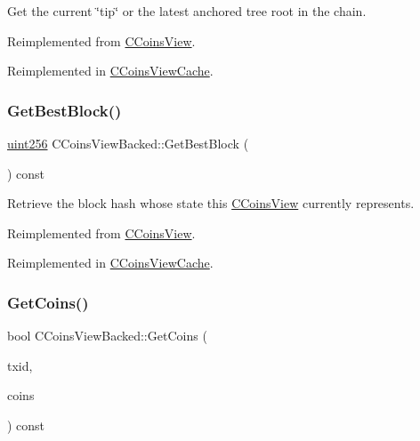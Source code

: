 Get the current \char`\"{}tip\char`\"{} or the latest anchored tree root in the chain. 



Reimplemented from \mbox{\hyperlink{class_c_coins_view_a4d51ab1de57e76a174b5ca874c601b52}{C\+Coins\+View}}.



Reimplemented in \mbox{\hyperlink{class_c_coins_view_cache_a8f1e864bff1617bae243bd0c7b29d2ed}{C\+Coins\+View\+Cache}}.

\mbox{\label{class_c_coins_view_backed_a39bca41ae922d0ce7f40e8aeab289280}} 
\subsubsection{\texorpdfstring{Get\+Best\+Block()}{GetBestBlock()}}
{\footnotesize\ttfamily \mbox{\hyperlink{classuint256}{uint256}} C\+Coins\+View\+Backed\+::\+Get\+Best\+Block (\begin{DoxyParamCaption}{ }\end{DoxyParamCaption}) const\hspace{0.3cm}{\ttfamily [virtual]}}



Retrieve the block hash whose state this \mbox{\hyperlink{class_c_coins_view}{C\+Coins\+View}} currently represents. 



Reimplemented from \mbox{\hyperlink{class_c_coins_view_af81f2907d360a2548d59a61388e5e5cb}{C\+Coins\+View}}.



Reimplemented in \mbox{\hyperlink{class_c_coins_view_cache_a1190c94a943c067d13211179ef06470b}{C\+Coins\+View\+Cache}}.

\mbox{\label{class_c_coins_view_backed_a456f9e85817556329a959c120998df5b}} 
\subsubsection{\texorpdfstring{Get\+Coins()}{GetCoins()}}
{\footnotesize\ttfamily bool C\+Coins\+View\+Backed\+::\+Get\+Coins (\begin{DoxyParamCaption}\item[{const \mbox{\hyperlink{classuint256}{uint256}} \&}]{txid,  }\item[{\mbox{\hyperlink{class_c_coins}{C\+Coins}} \&}]{coins }\end{DoxyParamCaption}) const\hspace{0.3cm}{\ttfamily [virtual]}}



